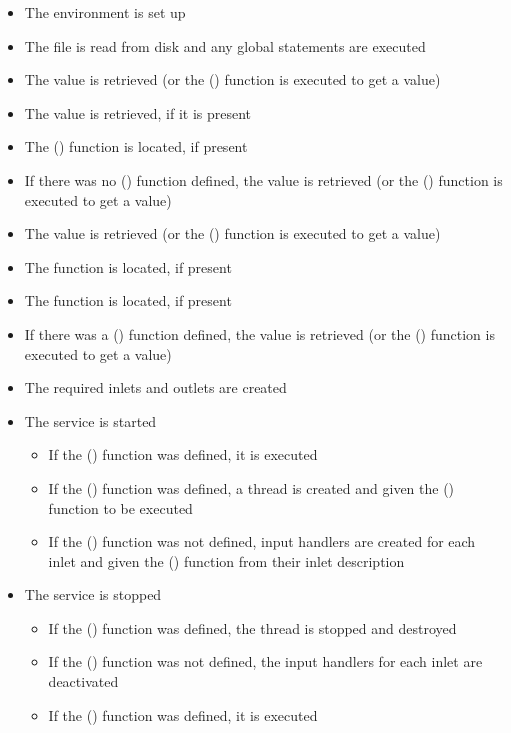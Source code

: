 \begin{itemize}
\item The \JS{} environment is set up
\item The \JS{} file is read from disk and any global statements are executed
\item The  value is retrieved (or the
() function is executed to get a value)
\item The  value is retrieved, if it is present
\item The () function is located, if present
\item If there was no () function defined, the 
value is retrieved (or the () function is executed to get a value)
\item The  value is retrieved (or the ()
function is executed to get a value)
\item The  function is located, if present
\item The  function is located, if present
\item If there was a () function defined, the 
value is retrieved (or the () function is executed to get a value)
\item The required inlets and outlets are created
\item The service is started
\begin{itemize}
\item If the () function was defined, it is executed
\item If the () function was defined, a thread is created and given
the () function to be executed
\item If the () function was not defined, input handlers are created
for each inlet and given the () function from their inlet description
\end{itemize}
\item The service is stopped
\begin{itemize}
\item If the () function was defined, the thread is stopped and
destroyed
\item If the () function was not defined, the input handlers
for each inlet are deactivated
\item If the () function was defined, it is executed
\end{itemize}
\end{itemize}
\secondaryEnd{}
\primaryEnd{}
